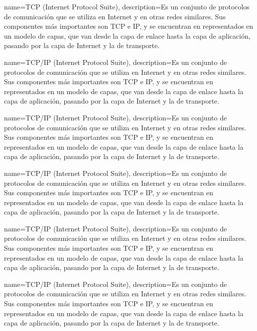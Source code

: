 {name=TCP (Internet Protocol Suite),
 description={Es un conjunto de protocolos de comunicación que se utiliza en Internet y en otras redes similares. Sus componentes más importantes son TCP e IP, y se encuentran en representados en un modelo de capas, que van desde la capa de enlace hasta la capa de aplicación, pasando por la capa de Internet y la de transporte.}
 }
 
{name=TCP/IP (Internet Protocol Suite),
 description={Es un conjunto de protocolos de comunicación que se utiliza en Internet y en otras redes similares. Sus componentes más importantes son TCP e IP, y se encuentran en representados en un modelo de capas, que van desde la capa de enlace hasta la capa de aplicación, pasando por la capa de Internet y la de transporte.}
 }
 
{name=TCP/IP (Internet Protocol Suite),
 description={Es un conjunto de protocolos de comunicación que se utiliza en Internet y en otras redes similares. Sus componentes más importantes son TCP e IP, y se encuentran en representados en un modelo de capas, que van desde la capa de enlace hasta la capa de aplicación, pasando por la capa de Internet y la de transporte.}
 }
 
{name=TCP/IP (Internet Protocol Suite),
 description={Es un conjunto de protocolos de comunicación que se utiliza en Internet y en otras redes similares. Sus componentes más importantes son TCP e IP, y se encuentran en representados en un modelo de capas, que van desde la capa de enlace hasta la capa de aplicación, pasando por la capa de Internet y la de transporte.}
 }
 
{name=TCP/IP (Internet Protocol Suite),
 description={Es un conjunto de protocolos de comunicación que se utiliza en Internet y en otras redes similares. Sus componentes más importantes son TCP e IP, y se encuentran en representados en un modelo de capas, que van desde la capa de enlace hasta la capa de aplicación, pasando por la capa de Internet y la de transporte.}
 }
 
{name=TCP/IP (Internet Protocol Suite),
 description={Es un conjunto de protocolos de comunicación que se utiliza en Internet y en otras redes similares. Sus componentes más importantes son TCP e IP, y se encuentran en representados en un modelo de capas, que van desde la capa de enlace hasta la capa de aplicación, pasando por la capa de Internet y la de transporte.}
 }
 
